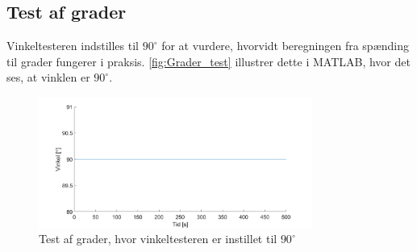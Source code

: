 \subsection{Test af grader}

Vinkeltesteren indstilles til $90^{\circ}$ for at vurdere, hvorvidt beregningen fra spænding til grader fungerer i praksis. \autoref{fig:Grader_test} illustrer dette i MATLAB, hvor det ses, at vinklen er $90^{\circ}$. 

\begin{figure}[H]
\centering
\includegraphics[width=0.8\textwidth]{figures/Grader_test}
\caption{Test af grader, hvor vinkeltesteren er instillet til $90^{\circ}$ }
\label{fig:Grader_test}
\end{figure}